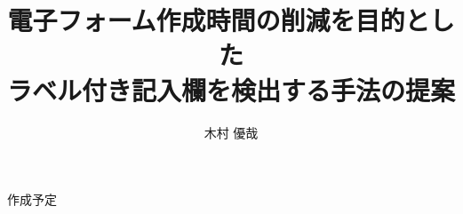 \documentclass[uplatex, report, a4j, 10pt]{jsbook}
\title{電子フォーム作成時間の削減を目的とした\\ラベル付き記入欄を検出する手法の提案\\}
\author{木村 優哉}
\begin{document}
\maketitle


%
%
作成予定

%
%














\end{document}
